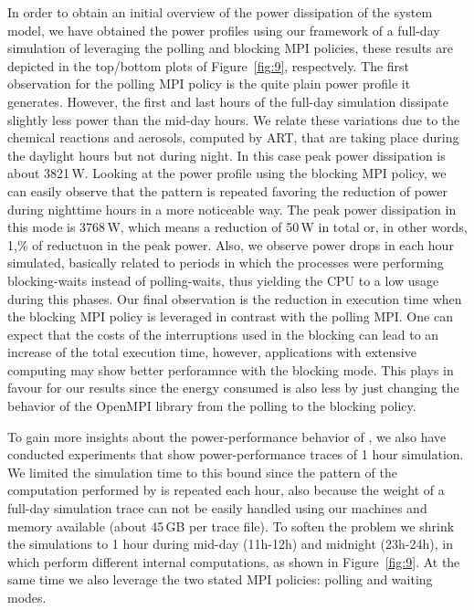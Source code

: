 In order to obtain an initial overview of the power dissipation of the system model, we have 
obtained the power profiles using our \pmlib framework of a full-day simulation of \cosmoart 
leveraging the polling and blocking MPI policies, these results are depicted in the top/bottom 
plots of Figure~\ref{fig:9}, respectvely. The first observation for 
the polling MPI policy is the quite plain power profile it generates. However, the first and 
last hours of the full-day simulation dissipate slightly less power than the mid-day hours. We 
relate these variations due to the chemical reactions and aerosols, computed by ART, that are 
taking place during the daylight hours but not during night. In this case peak power 
dissipation is about 3821\,W. Looking at the power profile using the blocking MPI policy, we 
can easily observe that the pattern is repeated favoring the reduction of power during 
nighttime hours in a more  noticeable way. The peak power dissipation in this mode is 3768\,W, 
which means a reduction of 50\,W in total or, in other words, 1,\% of reductuon in the peak 
power. Also, we observe power  drops in each hour simulated, basically related to periods in 
which the processes were performing blocking-waits instead of polling-waits, thus yielding the 
CPU to a low usage during this phases. Our final observation is the reduction in execution time 
when the blocking MPI policy is leveraged in contrast with the polling MPI. One can expect that 
the costs of the interruptions used in the blocking can lead to an increase of the total 
execution time, however, applications with extensive computing may show better perforamnce with 
the blocking mode. This plays in favour for our results since the energy consumed is also less 
by just changing the behavior of the OpenMPI library from the polling to the blocking policy.

To gain more insights about the power-performance behavior of \cosmoart, we also have conducted 
experiments that show power-performance traces of 1 hour simulation. We limited the simulation 
time to this bound since the pattern of the computation performed by \cosmoart is repeated each 
hour, also because the weight of a full-day simulation trace can not be easily handled using 
our machines and memory available (about 45\,GB per trace file). To soften the problem we 
shrink the simulations to 1 hour during mid-day (11h-12h) and midnight (23h-24h), in which 
\cosmoart perform different internal computations, as shown in Figure~\ref{fig:9}. At the same
time we also leverage the two stated MPI policies: polling and waiting modes.

